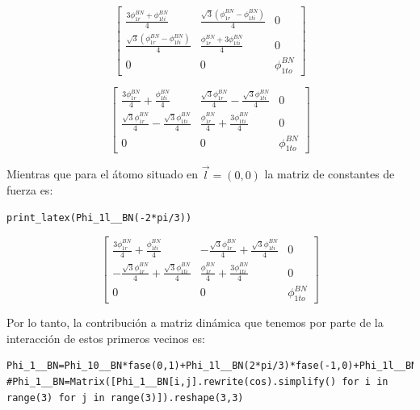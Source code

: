 \documentclass[12pt,a4paper]{article}
\begin{document}
\begin{equation}
\label{eq:3}
\left[\begin{matrix}\frac{3 \phi^{BN}_{1r} + \phi^{BN}_{1ti}}{4} & \frac{\sqrt{3} \left(\phi^{BN}_{1r} - \phi^{BN}_{1ti}\right)}{4} & 0\\\frac{\sqrt{3} \left(\phi^{BN}_{1r} - \phi^{BN}_{1ti}\right)}{4} & \frac{\phi^{BN}_{1r} + 3 \phi^{BN}_{1ti}}{4} & 0\\0 & 0 & \phi^{BN}_{1to}\end{matrix}\right]
\end{equation}

\begin{equation}
\label{eq:11}
\left[\begin{matrix}\frac{3 \phi^{BN}_{1r}}{4} + \frac{\phi^{BN}_{1ti}}{4} & \frac{\sqrt{3} \phi^{BN}_{1r}}{4} - \frac{\sqrt{3} \phi^{BN}_{1ti}}{4} & 0\\\frac{\sqrt{3} \phi^{BN}_{1r}}{4} - \frac{\sqrt{3} \phi^{BN}_{1ti}}{4} & \frac{\phi^{BN}_{1r}}{4} + \frac{3 \phi^{BN}_{1ti}}{4} & 0\\0 & 0 & \phi^{BN}_{1to}\end{matrix}\right]
\end{equation}

Mientras que para el átomo situado en \(\vec l= (0,0)\) la matriz de constantes de fuerza es:

\begin{verbatim}
print_latex(Phi_1l__BN(-2*pi/3))
\end{verbatim}

\begin{equation}
 \left[\begin{matrix}\frac{3 \phi^{BN}_{1r}}{4} + \frac{\phi^{BN}_{1ti}}{4} & - \frac{\sqrt{3} \phi^{BN}_{1r}}{4} + \frac{\sqrt{3} \phi^{BN}_{1ti}}{4} & 0\\- \frac{\sqrt{3} \phi^{BN}_{1r}}{4} + \frac{\sqrt{3} \phi^{BN}_{1ti}}{4} & \frac{\phi^{BN}_{1r}}{4} + \frac{3 \phi^{BN}_{1ti}}{4} & 0\\0 & 0 & \phi^{BN}_{1to}\end{matrix}\right]
\end{equation}

\newpage
\eject \pdfpagewidth=297mm \pdfpageheight=300mm

Por lo tanto, la contribución a matriz dinámica que tenemos por parte de la interacción de estos primeros vecinos es:

\begin{verbatim}
Phi_1__BN=Phi_10__BN*fase(0,1)+Phi_1l__BN(2*pi/3)*fase(-1,0)+Phi_1l__BN(-2*pi/3)*fase(0,0)
#Phi_1__BN=Matrix([Phi_1__BN[i,j].rewrite(cos).simplify() for i in range(3) for j in range(3)]).reshape(3,3)
\end{verbatim}
\end{document}

